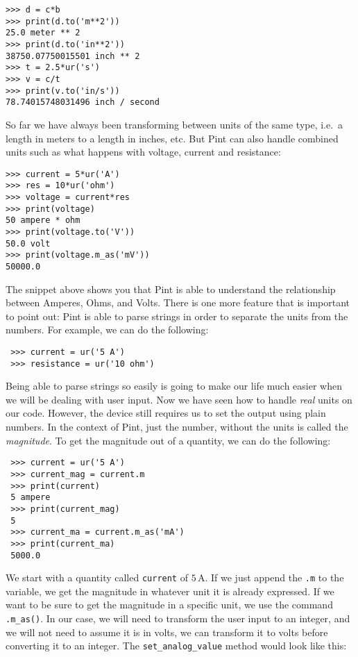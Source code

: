 \begin{verbatim}
>>> d = c*b
>>> print(d.to('m**2'))
25.0 meter ** 2
>>> print(d.to('in**2'))
38750.07750015501 inch ** 2
>>> t = 2.5*ur('s')
>>> v = c/t
>>> print(v.to('in/s'))
78.74015748031496 inch / second
\end{verbatim}

So far we have always been transforming between units of the same type, i.e.\ a length in meters to a length in inches, etc. But Pint can also handle combined units such as what happens with voltage, current and resistance:

\begin{verbatim}
>>> current = 5*ur('A')
>>> res = 10*ur('ohm')
>>> voltage = current*res
>>> print(voltage)
50 ampere * ohm
>>> print(voltage.to('V'))
50.0 volt
>>> print(voltage.m_as('mV'))
50000.0
\end{verbatim}

The snippet above shows you that Pint is able to understand the relationship between Amperes, Ohms, and Volts. There is one more feature that is important to point out: Pint is able to parse strings in order to separate the units from the numbers. For example, we can do the following:

\begin{verbatim}
 >>> current = ur('5 A')
 >>> resistance = ur('10 ohm')
\end{verbatim}

Being able to parse strings so easily is going to make our life much easier when we will be dealing with user input. Now we have seen how to handle \emph{real} units on our code. However, the device still requires us to set the output using plain numbers. In the context of Pint, just the number, without the units is called the \emph{magnitude}. To get the magnitude out of a quantity, we can do the following:

\begin{verbatim}
 >>> current = ur('5 A')
 >>> current_mag = current.m
 >>> print(current)
 5 ampere
 >>> print(current_mag)
 5
 >>> current_ma = current.m_as('mA')
 >>> print(current_ma)
 5000.0
\end{verbatim}

We start with a quantity called \texttt{current} of $5\,\textrm{A}$. If we just append the \texttt{.m} to the variable, we get the magnitude in whatever unit it is already expressed. If we want to be sure to get the magnitude in a specific unit, we use the command \texttt{.m\_as()}. In our case, we will need to transform the user input to an integer, and we will not need to assume it is in volts, we can transform it to volts before converting it to an integer. The \texttt{set\_analog\_value} method would look like this:

